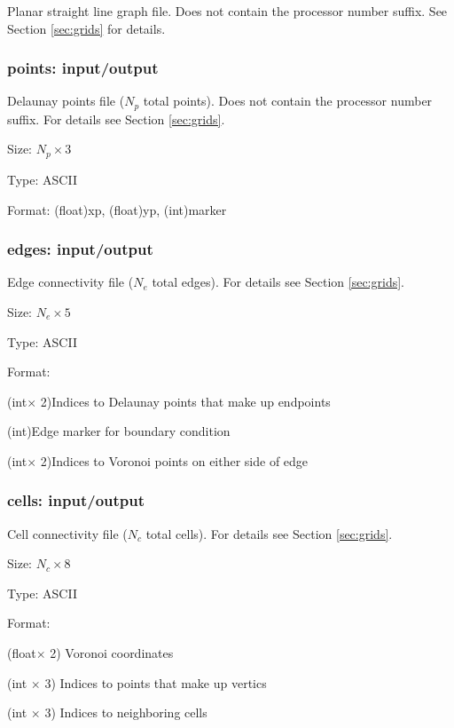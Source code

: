 \documentclass[12pt,oneside]{article}
\begin{document}
Planar straight line graph file. Does not contain the processor number suffix.
 See Section \ref{sec:grids} for details.

\subsubsection{points: input/output}

Delaunay points file ($N_p$ total points).  Does not contain
the processor number suffix. For details see Section \ref{sec:grids}.
\begin{list}{}
\item Size: $N_p\times 3$
\item Type: ASCII
\item Format: (float)xp, (float)yp, (int)marker
\end{list}

\subsubsection{edges: input/output}

Edge connectivity file ($N_e$ total edges). For details see Section \ref{sec:grids}.
\begin{list}{}
\item Size: $N_e\times 5$
\item Type: ASCII
\item Format: 
\begin{list}{}
\item (int$\times$ 2)Indices to Delaunay points that make up endpoints
\item (int)Edge marker for boundary condition
\item (int$\times$ 2)Indices to Voronoi points on either side of edge
\end{list}
\end{list}


\subsubsection{cells: input/output}

Cell connectivity file ($N_c$ total cells). For details see Section \ref{sec:grids}.
\begin{list}{}
\item Size: $N_c\times 8$
\item Type: ASCII
\item Format: 
\begin{list}{}
\item (float$\times$ 2) Voronoi coordinates
\item (int $\times$ 3) Indices to points that make up vertics
\item (int $\times$ 3) Indices to neighboring cells 
\end{list}
\end{list}
\end{document}
